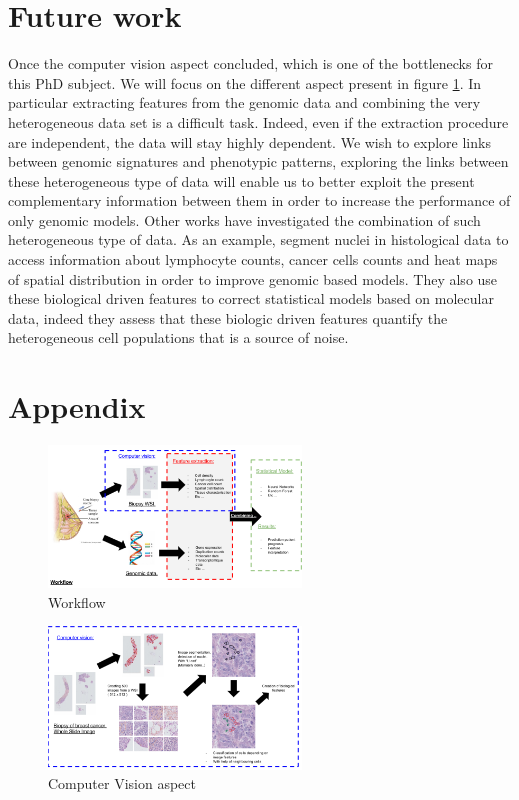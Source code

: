 \documentclass[a4paper,10pt,twocolumn]{article}
\begin{document}
 \section{Future work}
Once the computer vision aspect concluded, which is one of the bottlenecks for this PhD subject. We will focus on the different aspect present in figure \ref{workflow1}. In particular extracting features from the genomic data and combining the very heterogeneous data set is a difficult task. Indeed, even if the extraction procedure are independent, the data will stay highly dependent. We wish to explore links between genomic signatures and phenotypic patterns, exploring the links between these heterogeneous type of data will enable us to better exploit the present complementary information between them in order to increase the performance of only genomic models. Other works have investigated the combination of such heterogeneous type of data. As an example, \citet{yuan2012quantitative} segment nuclei in 
 histological data to access information about lymphocyte counts, cancer cells counts and 
 heat maps of spatial distribution in order to improve genomic based models.  They also use these biological 
 driven features to correct statistical models based on molecular data, indeed they assess that  
 these biologic driven features quantify the heterogeneous cell populations that is a source of 
 noise.
 
 \newpage
 

\section*{Appendix}


%
{\footnotesize
}


 \begin{figure}[!ht]
\centering
\includegraphics[width=0.6\textwidth]{Workflow_overview.png}
\caption{Workflow}
\label{workflow1}
\end{figure}


\begin{figure}[!ht]
\centering
\includegraphics[width=0.6\textwidth]{ComputerVision.png}
\caption{Computer Vision aspect}
\label{fig:ComputerVision}
\end{figure}
\end{document}
